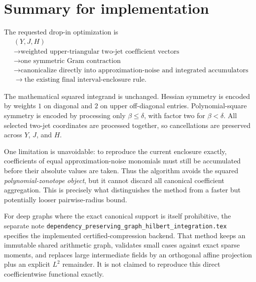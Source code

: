 \documentclass[11pt]{article}
\begin{document}
\section{Summary for implementation}

The requested drop-in optimization is
\[
\boxed{
\begin{aligned}
    &(Y,J,H)
    \\
    &\longrightarrow
    \text{weighted upper-triangular two-jet coefficient vectors}
    \\
    &\longrightarrow
    \text{one symmetric Gram contraction}
    \\
    &\longrightarrow
    \text{canonicalize directly into approximation-noise and integrated accumulators}
    \\
    &\longrightarrow
    \text{the existing final interval-enclosure rule}.
\end{aligned}
}
\]

The mathematical squared integrand is unchanged.  Hessian symmetry is encoded
by weights \(1\) on diagonal and \(2\) on upper off-diagonal entries.
Polynomial-square symmetry is encoded by processing only
\(\beta\leq\delta\), with factor two for \(\beta<\delta\).
All selected two-jet coordinates are processed together, so cancellations are
preserved across \(Y\), \(J\), and \(H\).

One limitation is unavoidable: to reproduce the current enclosure exactly,
coefficients of equal approximation-noise monomials must still be accumulated
before their absolute values are taken.  Thus the algorithm avoids the squared
\emph{polynomial-zonotope object}, but it cannot discard all canonical
coefficient aggregation.  This is precisely what distinguishes the method
from a faster but potentially looser pairwise-radius bound.

For deep graphs where the exact canonical support is itself prohibitive, the
separate note
\texttt{dependency\_preserving\_graph\_hilbert\_integration.tex} specifies
the implemented certified-compression backend.  That method keeps an immutable
shared arithmetic graph, validates small cases against exact sparse moments,
and replaces large intermediate fields by an orthogonal affine projection plus
an explicit $L^2$ remainder.  It is not claimed to reproduce this direct
coefficientwise functional exactly.
\end{document}
